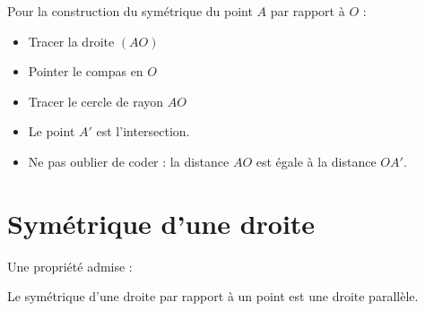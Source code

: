 Pour la construction du symétrique du point \( A\) par rapport à \( O\) :
\begin{itemize}
    \item Tracer la droite \( (AO)\)
    \item Pointer le compas en \( O\)
    \item Tracer le cercle de rayon \( AO\)
    \item Le point \( A'\) est l'intersection.
    \item Ne pas oublier de coder : la distance \( AO\) est égale à la distance \( OA'\).
\end{itemize}

\begin{center}
    
\end{center}

\section{Symétrique d'une droite}



Une propriété admise :
\begin{propriete}
    Le symétrique d'une droite par rapport à un point est une droite parallèle.
\end{propriete}

